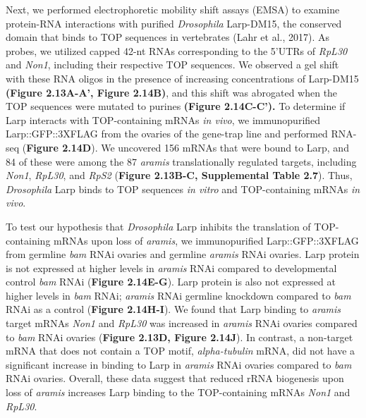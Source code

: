 \documentclass[12pt,oneside]{reedthesis}
\begin{document}
Next, we performed electrophoretic mobility shift assays (EMSA) to
examine protein-RNA interactions with purified \emph{Drosophila} Larp-DM15,
the conserved domain that binds to TOP sequences in vertebrates
(Lahr et al., 2017). As probes, we utilized capped 42-nt RNAs corresponding
to the 5'UTRs of \emph{RpL30} and \emph{Non1}, including their respective TOP
sequences. We observed a gel shift with these RNA oligos in the presence
of increasing concentrations of Larp-DM15 \textbf{(Figure 2.13A-A', Figure 2.14B)}, and this shift was abrogated when the TOP sequences were mutated
to purines \textbf{(Figure 2.14C-C').} To determine if Larp interacts with
TOP-containing mRNAs \emph{in vivo}, we immunopurified Larp::GFP::3XFLAG from
the ovaries of the gene-trap line and performed RNA-seq (\textbf{Figure 2.14D}). We uncovered 156 mRNAs that were bound to Larp, and 84 of these
were among the 87 \emph{aramis} translationally regulated targets, including
\emph{Non1}, \emph{RpL30}, and \emph{RpS2} (\textbf{Figure 2.13B-C, Supplemental Table 2.7}).
Thus, \emph{Drosophila} Larp binds to TOP sequences \emph{in vitro} and
TOP-containing mRNAs \emph{in vivo}.

To test our hypothesis that \emph{Drosophila} Larp inhibits the translation
of TOP-containing mRNAs upon loss of \emph{aramis}, we immunopurified
Larp::GFP::3XFLAG from germline \emph{bam} RNAi ovaries and germline \emph{aramis}
RNAi ovaries. Larp protein is not expressed at higher levels in \emph{aramis}
RNAi compared to developmental control \emph{bam} RNAi (\textbf{Figure 2.14E-G}).
Larp protein is also not expressed at higher levels in \emph{bam} RNAi;
\emph{aramis} RNAi germline knockdown compared to \emph{bam} RNAi as a control
(\textbf{Figure 2.14H-I}). We found that Larp binding to \emph{aramis} target mRNAs
\emph{Non1} and \emph{RpL30} was increased in \emph{aramis} RNAi ovaries compared to
\emph{bam} RNAi ovaries (\textbf{Figure 2.13D, Figure 2.14J}). In contrast, a
non-target mRNA that does not contain a TOP motif, \emph{alpha-tubulin} mRNA,
did not have a significant increase in binding to Larp in \emph{aramis} RNAi
ovaries compared to \emph{bam} RNAi ovaries. Overall, these data suggest that
reduced rRNA biogenesis upon loss of \emph{aramis} increases Larp binding to
the TOP-containing mRNAs \emph{Non1} and \emph{RpL30}.
\end{document}
